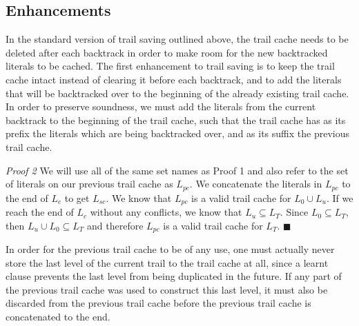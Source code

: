 \documentclass{article}
\begin{document}
	\begin{algorithm}
	\begin{algorithmic}[1]
				\ENDIF
			\ENDWHILE
		\ENDIF
	\ENDIF
	\end{algorithmic}
	\end{algorithm}

\subsection{Enhancements}

In the standard version of trail saving outlined above, the trail cache needs to be deleted after each backtrack in order to make room for the new backtracked literals to be cached. The first enhancement to trail saving is to keep the trail cache intact instead of clearing it before each backtrack, and to add the literals that will be backtracked over to the beginning of the already existing trail cache. In order to preserve soundness, we must add the literals from the current backtrack to the beginning of the trail cache, such that the trail cache has as its prefix the literals which are being backtracked over, and as its suffix the previous trail cache. \newline

\textit{Proof 2} We will use all of the same set names as Proof 1 and also refer to the set of literals on our previous trail cache as $L_{pc}$. We concatenate the literals in $L_{pc}$ to the end of $L_c$ to get $L_{sc}$. We know that $L_{pc}$ is a valid trail cache for $L_0 \cup L_u$. If we reach the end of $L_c$ without any conflicts, we know that $L_u \subseteq L_T$. Since $L_0 \subseteq L_T$, then $L_u \cup L_0 \subseteq L_T$ and therefore $L_{pc}$ is a valid trail cache for $L_T$. $\blacksquare$\newline

In order for the previous trail cache to be of any use, one must actually never store the last level of the current trail to the trail cache at all, since a learnt clause prevents the last level from being duplicated in the future. If any part of the previous trail cache was used to construct this last level, it must also be discarded from the previous trail cache before the previous trail cache is concatenated to the end.
\end{document}
